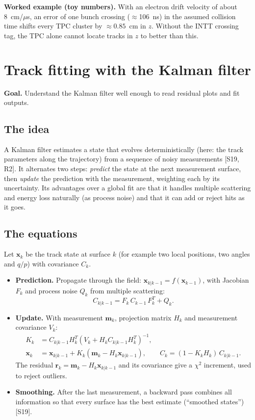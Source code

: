 \documentclass[11pt,letterpaper]{article}
\newcommand{\goal}[1]{\par\noindent\textbf{Goal.} #1\par}
\begin{document}
\textbf{Worked example (toy numbers).} With an electron drift velocity of about 8~cm/$\mu$s, an error of one bunch crossing ($\approx$106~ns) in the assumed collision time shifts every TPC cluster by $\approx0.85$~cm in $z$.
Without the INTT crossing tag, the TPC alone cannot locate tracks in $z$ to better than this.

\section{Track fitting with the Kalman filter}
\goal{Understand the Kalman filter well enough to read residual plots and fit outputs.}

\subsection{The idea}
A Kalman filter estimates a state that evolves deterministically (here: the track parameters along the trajectory) from a sequence of noisy measurements [S19, R2].
It alternates two steps: \emph{predict} the state at the next measurement surface, then \emph{update} the prediction with the measurement, weighting each by its uncertainty.
Its advantages over a global fit are that it handles multiple scattering and energy loss naturally (as process noise) and that it can add or reject hits as it goes.

\subsection{The equations}
Let $\mathbf{x}_k$ be the track state at surface $k$ (for example two local positions, two angles and $q/p$) with covariance $C_k$.
\begin{itemize}
\item \textbf{Prediction.} Propagate through the field: $\mathbf{x}_{k|k-1}=f(\mathbf{x}_{k-1})$, with Jacobian $F_k$ and process noise $Q_k$ from multiple scattering:
\begin{equation}
C_{k|k-1} = F_k\,C_{k-1}\,F_k^{T} + Q_k .
\end{equation}
\item \textbf{Update.} With measurement $\mathbf{m}_k$, projection matrix $H_k$ and measurement covariance $V_k$:
\begin{align}
K_k &= C_{k|k-1}H_k^T\left(V_k + H_kC_{k|k-1}H_k^T\right)^{-1},\\
\mathbf{x}_k &= \mathbf{x}_{k|k-1} + K_k\left(\mathbf{m}_k - H_k\mathbf{x}_{k|k-1}\right),\qquad C_k=(1-K_kH_k)\,C_{k|k-1}.
\end{align}
The residual $\mathbf{r}_k=\mathbf{m}_k-H_k\mathbf{x}_{k|k-1}$ and its covariance give a $\chi^2$ increment, used to reject outliers.
\item \textbf{Smoothing.} After the last measurement, a backward pass combines all information so that every surface has the best estimate (``smoothed states'') [S19].
\end{itemize}
\end{document}
